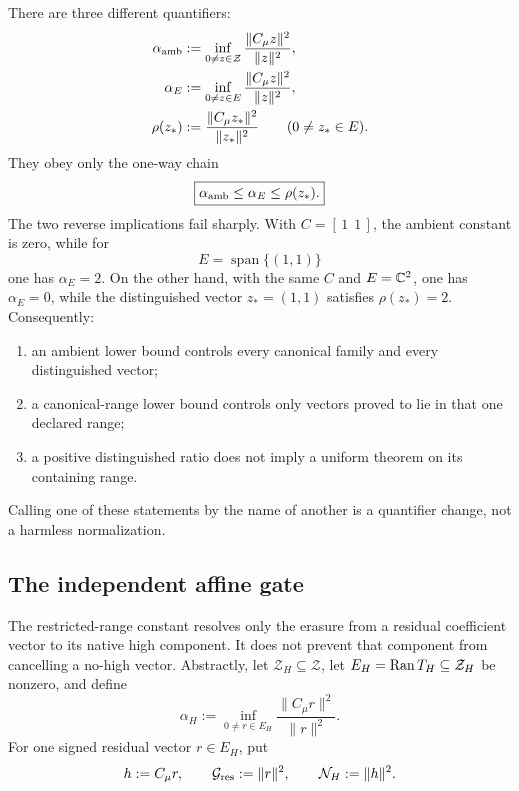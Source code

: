 There are three different quantifiers:
\begin{align}
 \alpha_{\rm amb}
 &:=\inf_{0\ne z\in\mathcal Z}
   \frac{\|C_\mu z\|^2}{\|z\|^2},
 \label{eq:tpc58-ambient-quantifier}\\
 \alpha_E
 &:=\inf_{0\ne z\in E}
   \frac{\|C_\mu z\|^2}{\|z\|^2},
 \label{eq:tpc58-canonical-range-quantifier}\\
 \rho(z_*)
 &:=\frac{\|C_\mu z_*\|^2}{\|z_*\|^2}
 \qquad(0\ne z_*\in E).
 \label{eq:tpc58-distinguished-quantifier}
\end{align}
They obey only the one-way chain
\begin{equation}
 \boxed{
 \alpha_{\rm amb}\le\alpha_E\le\rho(z_*).}
 \label{eq:tpc58-three-quantifier-chain}
\end{equation}
The two reverse implications fail sharply.  With
\(C=[\,1\ \ 1\,]\), the ambient constant is zero, while for
\begin{equation}
 E=\operatorname{span}\{(1,1)\}
 \label{eq:tpc58-canonical-beats-ambient}
\end{equation}
one has \(\alpha_E=2\).  On the other hand, with the same \(C\) and
\(E=\mathbb C^2\), one has \(\alpha_E=0\), while the distinguished vector
\(z_*=(1,1)\) satisfies \(\rho(z_*)=2\).  Consequently:
\begin{enumerate}[label=\textup{(Q\arabic*)},leftmargin=3.2em]
 \item an ambient lower bound controls every canonical family and every
       distinguished vector;
 \item a canonical-range lower bound controls only vectors proved to lie in
       that one declared range;
 \item a positive distinguished ratio does not imply a uniform theorem on
       its containing range.
\end{enumerate}
Calling one of these statements by the name of another is a quantifier
change, not a harmless normalization.

\subsection{The independent affine gate}

The restricted-range constant resolves only the erasure from a residual
coefficient vector to its native high component.  It does not prevent that
component from cancelling a no-high vector.  Abstractly, let
\(\mathcal Z_H\subseteq\mathcal Z\), let
\(E_H=\operatorname{Ran} T_H\subseteq\mathcal Z_H\) be nonzero, and define
\begin{equation}
 \alpha_H
 :=\inf_{0\ne r\in E_H}
   \frac{\|C_\mu r\|^2}{\|r\|^2}.
 \label{eq:tpc58-high-restricted-constant}
\end{equation}
For one signed residual vector \(r\in E_H\), put
\begin{equation}
 h:=C_\mu r,
 \qquad
 \mathcal G_{\rm res}:=\|r\|^2,
 \qquad
 \mathcal N_H:=\|h\|^2.
 \label{eq:tpc58-abstract-native-high-energy}
\end{equation}

